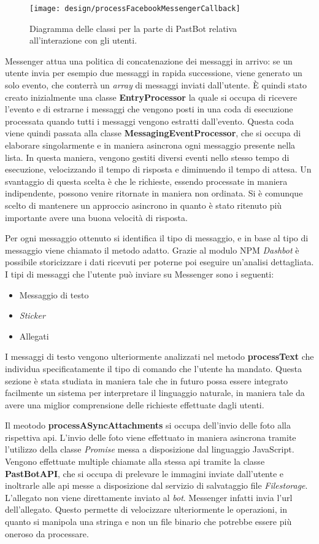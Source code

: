 \begin{figure}[H]
  \centering
  \texttt{[image: design/processFacebookMessengerCallback]}
  \caption{Diagramma delle classi per la parte di PastBot relativa
all'interazione con gli utenti.}
\end{figure}

Messenger attua una politica di concatenazione dei messaggi in arrivo: se un
utente invia per esempio due messaggi in rapida successione, viene generato un
solo evento, che conterrà un \textit{array} di messaggi inviati dall'utente. È
quindi stato creato inizialmente una classe \textbf{EntryProcessor} la quale si
occupa di ricevere l'evento e di estrarne i messaggi che vengono posti in una
coda di esecuzione processata quando tutti i messaggi vengono estratti
dall'evento.
Questa coda viene quindi passata alla classe \textbf{MessagingEventProcessor},
che si occupa di elaborare singolarmente e in maniera asincrona ogni messaggio
presente nella lista. In questa maniera, vengono gestiti diversi eventi nello
stesso tempo di esecuzione, velocizzando il tempo di risposta e diminuendo il
tempo di attesa. Un svantaggio di questa scelta è che le richieste,
essendo processate in maniera indipendente, possono venire ritornate in maniera
non ordinata. Si è comunque scelto di mantenere un approccio asincrono in
quanto è stato ritenuto più importante avere una buona velocità di risposta.

Per ogni messaggio ottenuto si identifica il tipo di messaggio, e in base al
tipo di messaggio viene chiamato il metodo adatto. Grazie al modulo NPM
\textit{Dashbot} è possibile storicizzare i dati ricevuti per poterne poi
eseguire un'analisi dettagliata.
I tipi di messaggi che l'utente può inviare su Messenger sono i seguenti:
\begin{itemize}
  \item Messaggio di testo
  \item \textit{Sticker}
  \item Allegati
\end{itemize}
I messaggi di testo vengono ulteriormente analizzati nel metodo
\textbf{processText} che individua specificatamente il tipo di comando che
l'utente ha mandato. Questa sezione è stata studiata in maniera tale che in
futuro possa essere integrato facilmente un sistema per interpretare il
linguaggio naturale, in maniera tale da avere una miglior comprensione delle
richieste effettuate dagli utenti.

Il meotodo \textbf{processASyncAttachments} si occupa dell'invio delle foto
alla rispettiva \gls{api}. L'invio delle foto viene effettuato in maniera
asincrona tramite l'utilizzo della classe \textit{Promise} messa a disposizione
dal linguaggio JavaScript. Vengono effettuate multiple chiamate alla stessa
\gls{api} tramite la classe \textbf{PastBotAPI}, che si occupa di prelevare le
immagini inviate dall'utente e inoltrarle alle \gls{api} messe a disposizione
dal servizio di salvataggio file \textit{Filestorage}.
L'allegato non viene direttamente inviato al \textit{bot}. Messenger infatti
invia l'\gls{url} dell'allegato. Questo permette di velocizzare ulteriormente le
operazioni, in quanto si manipola una stringa e non un file binario che
potrebbe essere più oneroso da processare.

